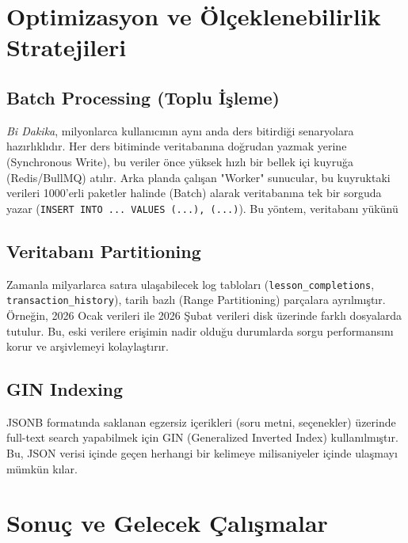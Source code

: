 \documentclass[12pt,a4paper]{report}
\begin{document}
\chapter{Optimizasyon ve Ölçeklenebilirlik Stratejileri}

\section{Batch Processing (Toplu İşleme)}
\textit{Bi Dakika}, milyonlarca kullanıcının aynı anda ders bitirdiği senaryolara hazırlıklıdır. Her ders bitiminde veritabanına doğrudan yazmak yerine (Synchronous Write), bu veriler önce yüksek hızlı bir bellek içi kuyruğa (Redis/BullMQ) atılır.
Arka planda çalışan "Worker" sunucular, bu kuyruktaki verileri 1000'erli paketler halinde (Batch) alarak veritabanına tek bir sorguda yazar (\texttt{INSERT INTO ... VALUES (...), (...)}). Bu yöntem, veritabanı yükünü %

\section{Veritabanı Partitioning}
Zamanla milyarlarca satıra ulaşabilecek log tabloları (\texttt{lesson\_completions}, \texttt{transaction\_history}), tarih bazlı (Range Partitioning) parçalara ayrılmıştır. Örneğin, 2026 Ocak verileri ile 2026 Şubat verileri disk üzerinde farklı dosyalarda tutulur. Bu, eski verilere erişimin nadir olduğu durumlarda sorgu performansını korur ve arşivlemeyi kolaylaştırır.

\section{GIN Indexing}
JSONB formatında saklanan egzersiz içerikleri (soru metni, seçenekler) üzerinde full-text search yapabilmek için GIN (Generalized Inverted Index) kullanılmıştır. Bu, JSON verisi içinde geçen herhangi bir kelimeye milisaniyeler içinde ulaşmayı mümkün kılar.

\chapter{Sonuç ve Gelecek Çalışmalar}
\end{document}

